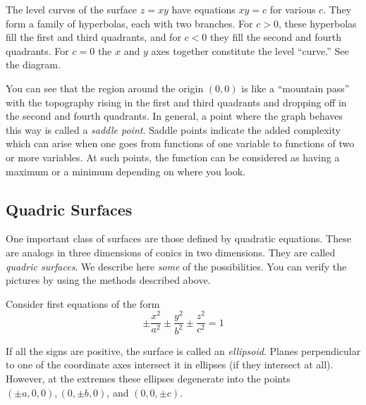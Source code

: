 \begin{center}
\end{center}

\begin{example}
	The level curves of the surface $z = xy$ have equations
	$xy = c$ for various $c$.  They form 
	a family of hyperbolas, each with two branches.  For $c > 0$,
	these hyperbolas fill the first and third quadrants, and for
	$c < 0$ they fill the second and fourth quadrants.  For $c  = 0$
	the $x$ and $y$ axes together constitute the level ``curve.''
	See the diagram.

	You can see that the region around the origin $(0,0)$ is like a
	``mountain pass'' with the topography rising in the first and
	third quadrants and dropping off in the second and fourth quadrants.
	In general, a point where the graph behaves this way is called
	a \emph{saddle point}.   Saddle points indicate the added complexity
	which can arise when one goes from functions of one variable to
	functions of two or more variables.  At such points, the function
	can be considered as having a maximum  or
	 a minimum depending on where you
	look.
\end{example}

\subsection{Quadric Surfaces}
One important class of surfaces are those defined by quad\-rat\-ic
equations.  These are analogs in three dimensions of
conics in two dimensions.  They are called \emph{quadric surfaces}.  
We describe here \emph{some} of the possibilities.
You can verify the pictures by using the methods described above.

Consider first equations of the form
\[
   \pm \frac{x^2}{a^2} 
   \pm \frac{y^2}{b^2} 
   \pm \frac{z^2}{c^2} = 1
\]

If all the signs are positive, the surface is called an {\it 
ellipsoid}.
Planes perpendicular to one of the coordinate axes intersect it
in ellipses (if they intersect at all).   However, at the extremes
these ellipses degenerate into the points $(\pm a, 0, 0),
(0,\pm b, 0)$, and $(0,0,\pm c)$.

